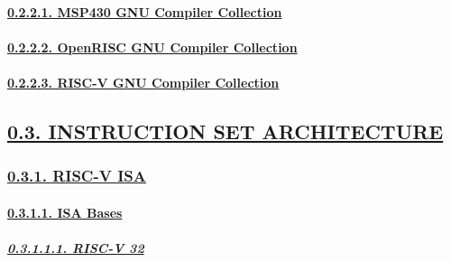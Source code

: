\documentclass[
]{article}
\begin{document}
\hypertarget{msp430-gnu-compiler-collection}{%
\paragraph{\texorpdfstring{\protect\hyperlink{msp430-gnu-compiler-collection-1}{0.2.2.1.
MSP430 GNU Compiler
Collection}}{0.2.2.1. MSP430 GNU Compiler Collection}}\label{msp430-gnu-compiler-collection}}

\hypertarget{openrisc-gnu-compiler-collection}{%
\paragraph{\texorpdfstring{\protect\hyperlink{openrisc-gnu-compiler-collection-1}{0.2.2.2.
OpenRISC GNU Compiler
Collection}}{0.2.2.2. OpenRISC GNU Compiler Collection}}\label{openrisc-gnu-compiler-collection}}

\hypertarget{risc-v-gnu-compiler-collection}{%
\paragraph{\texorpdfstring{\protect\hyperlink{risc-v-gnu-compiler-collection-1}{0.2.2.3.
RISC-V GNU Compiler
Collection}}{0.2.2.3. RISC-V GNU Compiler Collection}}\label{risc-v-gnu-compiler-collection}}

\hypertarget{instruction-set-architecture}{%
\subsection{\texorpdfstring{\protect\hyperlink{instruction-set-architecture-1}{0.3.
INSTRUCTION SET
ARCHITECTURE}}{0.3. INSTRUCTION SET ARCHITECTURE}}\label{instruction-set-architecture}}

\hypertarget{risc-v-isa}{%
\subsubsection{\texorpdfstring{\protect\hyperlink{risc-v-isa-1}{0.3.1.
RISC-V ISA}}{0.3.1. RISC-V ISA}}\label{risc-v-isa}}

\hypertarget{isa-bases}{%
\paragraph{\texorpdfstring{\protect\hyperlink{isa-bases-3}{0.3.1.1. ISA
Bases}}{0.3.1.1. ISA Bases}}\label{isa-bases}}

\hypertarget{risc-v-32}{%
\subparagraph{\texorpdfstring{\protect\hyperlink{risc-v-32-1}{0.3.1.1.1.
RISC-V 32}}{0.3.1.1.1. RISC-V 32}}\label{risc-v-32}}
\end{document}
